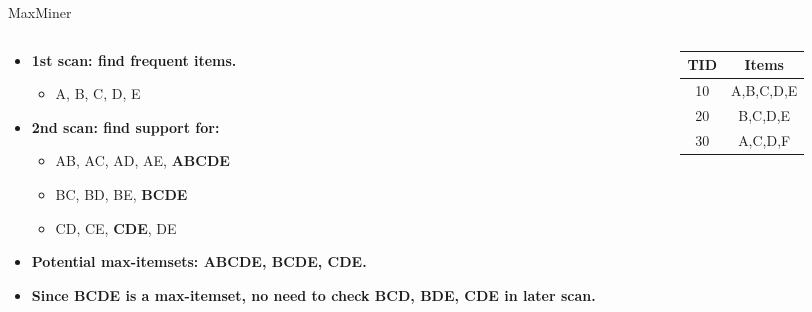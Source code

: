 \begin{frame}{MaxMiner}
	\begin{columns}[c]
		\begin{column}{0.6\textwidth}
			\begin{itemize}
				\item \textbf{1st scan: find frequent items.}
				      \begin{itemize}
					      \item A, B, C, D, E
				      \end{itemize}
				\item \textbf{2nd scan: find support for:}
				      \begin{itemize}
					      \item AB, AC, AD, AE, \textbf{ABCDE}
					      \item BC, BD, BE, \textbf{BCDE}
					      \item CD, CE, \textbf{CDE}, DE
				      \end{itemize}
				\item \textbf{Potential max-itemsets: ABCDE, BCDE, CDE.}
				\item \textbf{Since BCDE is a max-itemset, no need to check
					      BCD, BDE, CDE in later scan.}
			\end{itemize}
		\end{column}
		\begin{column}{0.3\textwidth}
			\begin{tabular}{|c|c|}
				\hline
				\textbf{TID} & \textbf{Items} \\\hline
				10           & A,B,C,D,E      \\\hline
				20           & B,C,D,E        \\\hline
				30           & A,C,D,F        \\\hline
			\end{tabular}
		\end{column}
	\end{columns}
\end{frame}
